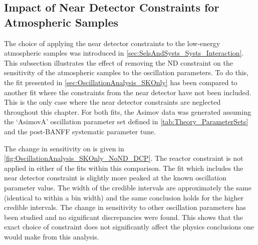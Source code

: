
\clearpage
\subsection{Impact of Near Detector Constraints for Atmospheric Samples}
\label{sec:OscillationAnalysis_SKOnly_NoND}

The choice of applying the near detector constraints to the low-energy atmospheric samples was introduced in \autoref{sec:SelsAndSysts_Systs_Interaction}. This subsection illustrates the effect of removing the ND constraint on the sensitivity of the atmospheric samples to the oscillation parameters. To do this, the fit presented in \autoref{sec:OscillationAnalysis_SKOnly} has been compared to another fit where the constraints from the near detector have not been included.
This is the only case where the near detector constraints are neglected throughout this chapter. For both fits, the Asimov data was generated assuming the `AsimovA' oscillation parameter set defined in \autoref{tab:Theory_ParameterSets} and the post-BANFF systematic parameter tune.

The change in sensitivity on  is given in \autoref{fig:OscillationAnalysis_SKOnly_NoND_DCP}. The reactor constraint is not applied in either of the fits within this comparison. The fit which includes the near detector constraint is slightly more peaked at the known oscillation parameter value. The width of the \quickmath{1\sigma} credible intervals are approximately the same (identical to within a bin width) and the same conclusion holds for the higher credible intervals. The change in sensitivity to other oscillation parameters has been studied and no significant discrepancies were found. This shows that the exact choice of constraint does not significantly affect the physics conclusions one would make from this analysis.

